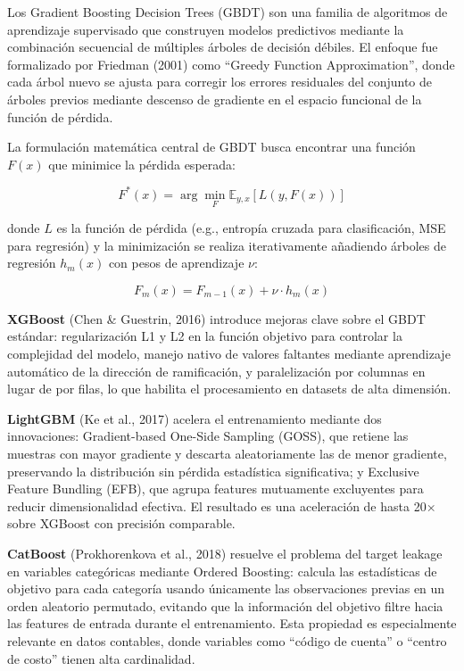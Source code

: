 Los Gradient Boosting Decision Trees (GBDT) son una familia de
algoritmos de aprendizaje supervisado que construyen modelos predictivos
mediante la combinación secuencial de múltiples árboles de decisión
débiles. El enfoque fue formalizado por Friedman (2001) como ``Greedy
Function Approximation'', donde cada árbol nuevo se ajusta para corregir
los errores residuales del conjunto de árboles previos mediante descenso
de gradiente en el espacio funcional de la función de pérdida.

La formulación matemática central de GBDT busca encontrar una función
\(F(x)\) que minimice la pérdida esperada:

\[F^*(x) = \arg\min_{F} \mathbb{E}_{y,x}[L(y, F(x))]\]

donde \(L\) es la función de pérdida (e.g., entropía cruzada para
clasificación, MSE para regresión) y la minimización se realiza
iterativamente añadiendo árboles de regresión \(h_m(x)\) con pesos de
aprendizaje \(\nu\):

\[F_m(x) = F_{m-1}(x) + \nu \cdot h_m(x)\]

\textbf{XGBoost} (Chen \& Guestrin, 2016) introduce mejoras clave sobre
el GBDT estándar: regularización L1 y L2 en la función objetivo para
controlar la complejidad del modelo, manejo nativo de valores faltantes
mediante aprendizaje automático de la dirección de ramificación, y
paralelización por columnas en lugar de por filas, lo que habilita el
procesamiento en datasets de alta dimensión.

\textbf{LightGBM} (Ke et al., 2017) acelera el entrenamiento mediante
dos innovaciones: Gradient-based One-Side Sampling (GOSS), que retiene
las muestras con mayor gradiente y descarta aleatoriamente las de menor
gradiente, preservando la distribución sin pérdida estadística
significativa; y Exclusive Feature Bundling (EFB), que agrupa features
mutuamente excluyentes para reducir dimensionalidad efectiva. El
resultado es una aceleración de hasta 20× sobre XGBoost con precisión
comparable.

\textbf{CatBoost} (Prokhorenkova et al., 2018) resuelve el problema del
target leakage en variables categóricas mediante Ordered Boosting:
calcula las estadísticas de objetivo para cada categoría usando
únicamente las observaciones previas en un orden aleatorio permutado,
evitando que la información del objetivo filtre hacia las features de
entrada durante el entrenamiento. Esta propiedad es especialmente
relevante en datos contables, donde variables como ``código de cuenta''
o ``centro de costo'' tienen alta cardinalidad.

